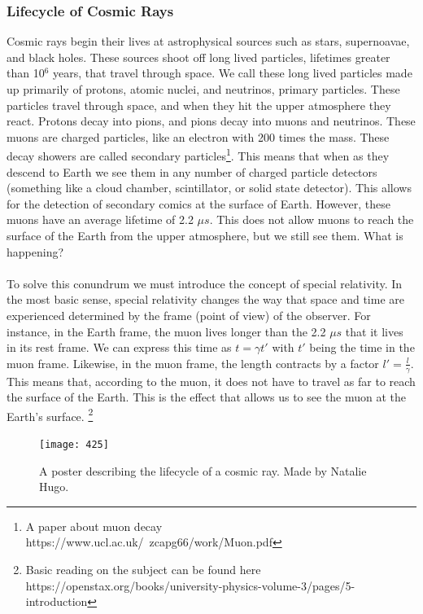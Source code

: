 \documentclass{article}
\begin{document}
\subsubsection{Lifecycle of Cosmic Rays}
Cosmic rays begin their lives at astrophysical sources such as stars, supernoavae, and black holes. These sources shoot off long lived particles, lifetimes greater than 10$^6$ years, that travel through space. We call these long lived particles made up primarily of protons, atomic nuclei, and neutrinos, primary particles. These particles travel through space, and when they hit the upper atmosphere they react. Protons decay into pions, and pions decay into muons and neutrinos. These muons are charged particles, like an electron with 200 times the mass. These decay showers are called secondary particles\footnote{A paper about muon decay https://www.ucl.ac.uk/~zcapg66/work/Muon.pdf}. This means that when as they descend to Earth we see them in any number of charged particle detectors (something like a cloud chamber, scintillator, or solid state detector). This allows for the detection of secondary comics at the surface of Earth. However, these muons have an average lifetime of 2.2 $\mu s$. This does not allow muons to reach the surface of the Earth from the upper atmosphere, but we still see them. What is happening?
\\\\
To solve this conundrum we must introduce the concept of special relativity. In the most basic sense, special relativity changes the way that space and time are experienced determined by the frame (point of view) of the observer. For instance, in the Earth frame, the muon lives longer than the 2.2 $\mu s$ that it lives in its rest frame. We can express this time as $t = \gamma t'$ with $t'$ being the time in the muon frame. Likewise, in the muon frame, the length contracts by a factor $l' = \frac{l}{\gamma}$. This means that, according to the muon, it does not have to travel as far to reach the surface of the Earth. This is the effect that allows us to see the muon at the Earth's surface. \footnote{Basic reading on the subject can be found here https://openstax.org/books/university-physics-volume-3/pages/5-introduction}
\begin{figure}[h!]
    \centering
    \texttt{[image: 425]}
    \caption{A poster describing the lifecycle of a cosmic ray. Made by Natalie Hugo.}
    \label{fig:enter-label}
\end{figure}
\end{document}
